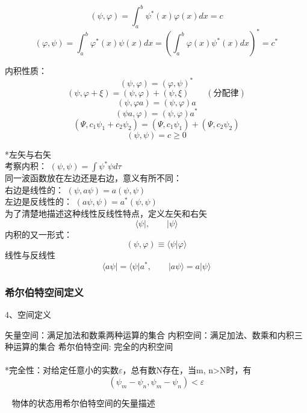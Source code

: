 \begin{frame} 
    \例 [2. 求定义在x空间的函数的内积]{}

    \解 ~ \[(\psi, \varphi)=\int_a ^b \psi^*(x)  \varphi(x) dx=c\]
    \[(\varphi,\psi)=\int_a ^b \varphi^*(x)\psi(x) dx = (\int_a ^b \varphi(x)\psi^*(x) dx) ^* =c^*\]
\end{frame} 

\begin{frame}
    内积性质：
    \[(\psi, \varphi)= (\varphi,\psi)^* \]
    \[(\psi, \varphi+\xi)= (\psi, \varphi) + (\psi, \xi)\qquad (\text{分配律})\]
    \[(\psi, \varphi a)= (\psi, \varphi )a \]
    \[(\psi a, \varphi )= (\psi, \varphi )a^* \]    
    \[(\Psi,c_1\psi_1+c_2\psi_2)=(\Psi,c_1\psi_1)+(\Psi,c_2\psi_2)\]
    \[(\psi,\psi)= c\ge 0\]
\end{frame}

\begin{frame}{}
    *左矢与右矢\\ \vspace{0.6em}
    考察内积： $(\psi,\psi)=\int\psi^*\psi d\tau$ \\
    同一波函数放在左边还是右边，意义有所不同： \\
    右边是线性的：  $(\psi,a\psi)=a (\psi,\psi)$ \\
    左边是反线性的：   $(a\psi,\psi)=a^* (\psi,\psi)$  \\
    为了清楚地描述这种线性反线性特点，定义左矢和右矢
    $$\langle \psi |, \qquad |\psi \rangle $$ 
    内积的又一形式：\[(\psi,\varphi)\equiv \langle \psi | \varphi \rangle\]
    线性与反线性$$\langle a\psi | = \langle \psi |a^* ,\qquad |a\psi \rangle = a|\psi \rangle$$ 
\end{frame}

\begin{frame}
    \frametitle{希尔伯特空间定义}
    4、空间定义\\
   \begin{itemize}
       \Item 矢量空间：满足加法和数乘两种运算的集合
       \Item 内积空间：满足加法、数乘和内积三种运算的集合
       \Item 希尔伯特空间:  完全的内积空间\\
       ~~ \\
       *完全性：对给定任意小的实数$\varepsilon$，总有数N存在，当m, n>N时，有\\
       $$ (\psi_m -\psi_n, \psi_m -\psi_n )< \varepsilon $$
   \end{itemize} 
   \Tips ~ 物体的状态用希尔伯特空间的矢量描述
\end{frame} 

